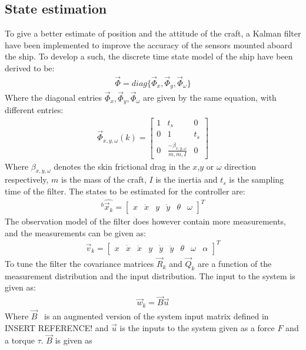 \documentclass{ifacconf}
\begin{document}
\subsection{State estimation}
To give a better estimate of position and the attitude of the craft, a Kalman filter have been implemented to improve the accuracy of the sensors mounted aboard the ship. To develop a such, the discrete time state model of the ship have been derived to be:
\begin{align}
\vec{\Phi} = diag\{\vec{\Phi} _x,\vec{\Phi} _y,\vec{\Phi} _\omega\}
\end{align}
Where the diagonal entries $\vec{\Phi} _x,\vec{\Phi} _y,\vec{\Phi} _\omega$ are given by the same equation, with different entries:
\begin{align}
\vec{\Phi}_{x,y,\omega}(k) = \begin{bmatrix}
1 & t_s & 0\\
0 & 1 & t_s\\
0 & \frac{-\beta_{x,y,\omega}}{m,m,I} & 0
\end{bmatrix}
\end{align}
Where $\beta_{x,y,\omega}$ denotes the skin frictional drag in the $x$,$y$ or $\omega$ direction respectively, $m$ is the mass of the craft, $I$ is the inertia and $t_s$ is the sampling time of the filter. The states to be estimated for the controller are:
\begin{align}
^b\hat{\vec{x}_k} = \begin{bmatrix}
x & \dot{x} & y & \dot{y} & \theta & \omega
\end{bmatrix}^T
\end{align}
The observation model of the filter does however contain more measurements, and the measurements can be given as:
\begin{align}
\vec{v}_k = \begin{bmatrix}
x & \dot{x} & \ddot{x} & y & \dot{y} & \ddot{y} & \theta & \omega & \alpha
\end{bmatrix}^T
\end{align}
To tune the filter the covariance matrices $\vec{R}_k$ and $\vec{Q}_k$ are a function of the measurement distribution and the input distribution. The input to the system is given as:
\begin{align}
\vec{w}_k = \vec{B}\vec{u}
\end{align}
Where $\vec{B}$  is an augmented version of the system input matrix defined in INSERT REFERENCE! and $\vec{u}$ is the inputs to the system given as a force $F$ and a torque $\tau$. $\vec{B}$ is given as 
\end{document}
